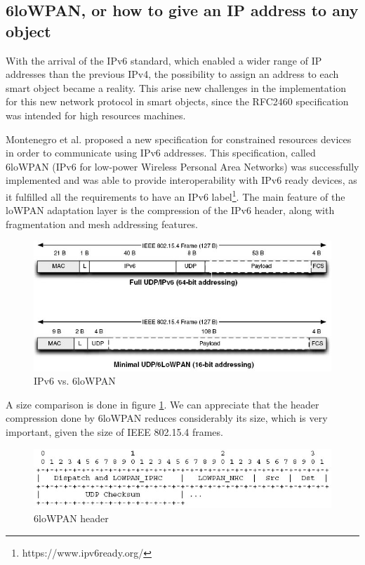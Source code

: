 \subsection{6loWPAN, or how to give an IP address to any object}
With the arrival of the IPv6 standard\cite{rfc2460}, which enabled a wider range of IP addresses than the previous IPv4, the possibility to assign an address to each smart object became a reality.
This arise new challenges in the implementation for this new network protocol in smart objects, since the RFC2460 specification was intended for high resources machines.

Montenegro et al. proposed a new specification\cite{rfc4944} for constrained resources devices in order to communicate using IPv6 addresses.
This specification, called 6loWPAN (IPv6 for low-power Wireless Personal Area Networks) was successfully implemented\cite{durvy08making} and was able to provide interoperability with IPv6 ready devices, as it fulfilled all the requirements to have an IPv6 label\footnote{https://www.ipv6ready.org/}.
The main feature of the loWPAN adaptation layer is the compression of the IPv6 header, along with fragmentation and mesh addressing features.

\begin{figure}[htb]
	\centering
	\includegraphics[width=1\columnwidth]{chapters/background.images/6lowpanvsipv6.jpg}
	\caption{IPv6 vs. 6loWPAN \cite{shelby2010embedded}}
	\label{fig:IPv6vs6loWPAN}
\end{figure}

A size comparison is done in figure \ref{fig:IPv6vs6loWPAN}.
We can appreciate that the header compression done by 6loWPAN reduces considerably its size, which is very important, given the size of IEEE 802.15.4 frames.

\begin{figure}[htb]
	\centering
	\includegraphics[width=1\columnwidth]{chapters/background.images/6lowpanDetails.jpg}
	\caption{6loWPAN header}
	\label{fig:6loWPANmin}
\end{figure}

